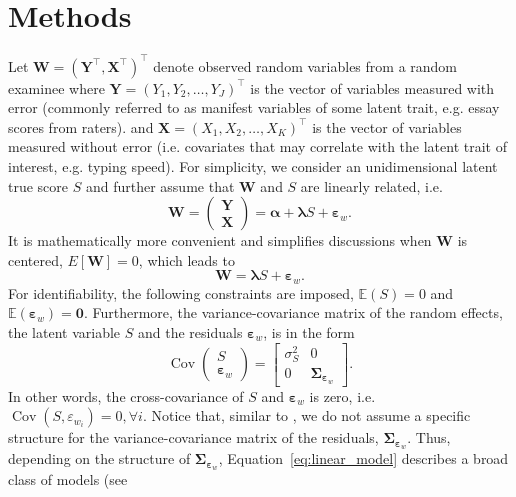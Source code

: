 \documentclass[man, floatsintext]{apa7}
\newcommand{\mbf}[1]{\bm{#1}}
\newcommand{\bX}{\mbf{X}}
\newcommand{\bY}{\mbf{Y}}
\newcommand{\beps}{\mbf{\varepsilon}}
\newcommand{\blambda}{\mbf{\lambda}}
\newcommand{\bW}{\mbf{W}}
\newcommand{\bsigma}{\mbf{\Sigma}}
\newcommand{\E}{\mathbb{E}}
\DeclareMathOperator{\Cov}{Cov}
\begin{document}
  \section{Methods}
  Let $\bW = (\bY^\top, \bX^\top)^\top$ denote observed random variables
  from a random examinee where $\bY = (Y_1, Y_2, \dots, Y_J)^\top$ is the vector
  of variables measured with error (commonly referred to as manifest
  variables of some latent trait, e.g. essay scores from raters).
  and $\bX = (X_1, X_2, \dots, X_K)^\top$ is the vector of variables measured
  without error (i.e. covariates that may correlate with the latent
  trait of interest, e.g. typing speed).  For simplicity, we consider an
  unidimensional latent true score $S$ and further assume that $\bW$ and $S$ are
  linearly related, i.e.
  \begin{equation}
    \mbf{W} = \left (
      \begin{array}{c} \bY \\  \bX \end{array} \right ) =
    \mbf{\alpha} + \mbf{\lambda} S + \mbf{\varepsilon}_w.
  \end{equation}
  It is mathematically more convenient and simplifies discussions when $\bW$ is
  centered, $E[\bW] = 0$, which leads to
  \begin{equation}
  \label{eq:linear_model}
    \bW = \blambda S + \mbf{\varepsilon}_w.
  \end{equation}
  For identifiability, the following constraints are imposed, $\E(S) = 0$ and
  $\E(\beps_w) = \mbf{0}$. Furthermore, the variance-covariance matrix of the
  random effects, the latent variable $S$ and the residuals $\beps_w$, is in the
  form
  \begin{equation}
    \Cov\left(\begin{array}{c} S \\ \beps_w \end{array}\right) = \begin{bmatrix}
      \sigma_S^2 & 0 \\
      0 & \bsigma_{\beps_w}
    \end{bmatrix}.
  \end{equation}
  In other words, the cross-covariance of $S$ and $\beps_w$ is zero, i.e.
  $\Cov(S, \varepsilon_{w_i}) = 0, \forall i$.
  Notice that, similar to \textcite{Haberman2015}, we do not assume a specific
  structure for the variance-covariance matrix of the residuals, $\bsigma_
  {\beps_w}$. Thus, depending on the structure of $\bsigma_{\beps_w}$,
  Equation~\ref{eq:linear_model} describes a broad class of models (see
\end{document}
